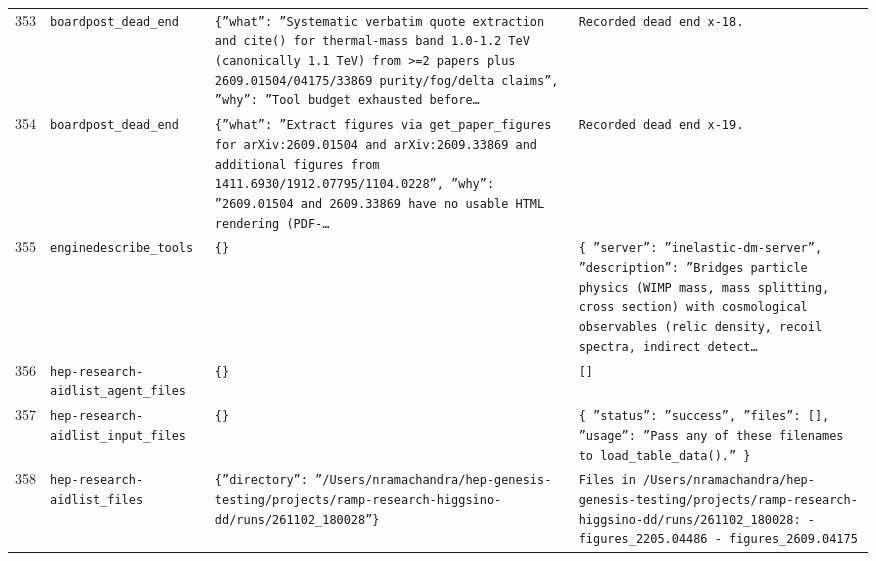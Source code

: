 \documentclass[11pt,a4paper]{article}
\begin{document}
\begin{longtable}{@{}p{}p{}p{}p{}@{}}
353 & \texttt{board}\newline\texttt{post\_\allowbreak{}dead\_\allowbreak{}end} & \texttt{\{''what'':\allowbreak{} ''Systematic verbatim quote extraction and cite()\allowbreak{} for thermal-mass band 1.0-1.2 TeV (canonically 1.1 TeV)\allowbreak{} from \textgreater{}\allowbreak{}=\allowbreak{}2 papers plus 2609.01504/\allowbreak{}04175/\allowbreak{}33869 purity/\allowbreak{}fog/\allowbreak{}delta claims'',\allowbreak{} ''why'':\allowbreak{} ''Tool budget exhausted before\ldots{}\allowbreak{}} & \texttt{Recorded dead end x-18.} \\
354 & \texttt{board}\newline\texttt{post\_\allowbreak{}dead\_\allowbreak{}end} & \texttt{\{''what'':\allowbreak{} ''Extract figures via get\_\allowbreak{}paper\_\allowbreak{}figures for arXiv:\allowbreak{}2609.01504 and arXiv:\allowbreak{}2609.33869 and additional figures from 1411.6930/\allowbreak{}1912.07795/\allowbreak{}1104.0228'',\allowbreak{} ''why'':\allowbreak{} ''2609.01504 and 2609.33869 have no usable HTML rendering (PDF-\ldots{}\allowbreak{}} & \texttt{Recorded dead end x-19.} \\
355 & \texttt{engine}\newline\texttt{describe\_\allowbreak{}tools} & \texttt{\{\}\allowbreak{}} & \texttt{\{   ''server'':\allowbreak{} ''inelastic-dm-server'',\allowbreak{}   ''description'':\allowbreak{} ''Bridges particle physics (WIMP mass,\allowbreak{} mass splitting,\allowbreak{} cross section)\allowbreak{} with cosmological observables (relic density,\allowbreak{} recoil spectra,\allowbreak{} indirect detect\ldots{}\allowbreak{}} \\
356 & \texttt{hep-research-aid}\newline\texttt{list\_\allowbreak{}agent\_\allowbreak{}files} & \texttt{\{\}\allowbreak{}} & \texttt{[]\allowbreak{}} \\
357 & \texttt{hep-research-aid}\newline\texttt{list\_\allowbreak{}input\_\allowbreak{}files} & \texttt{\{\}\allowbreak{}} & \texttt{\{   ''status'':\allowbreak{} ''success'',\allowbreak{}   ''files'':\allowbreak{} []\allowbreak{},\allowbreak{}   ''usage'':\allowbreak{} ''Pass any of these filenames to load\_\allowbreak{}table\_\allowbreak{}data()\allowbreak{}.'' \}\allowbreak{}} \\
358 & \texttt{hep-research-aid}\newline\texttt{list\_\allowbreak{}files} & \texttt{\{''directory'':\allowbreak{} ''/\allowbreak{}Users/\allowbreak{}nramachandra/\allowbreak{}hep-genesis-testing/\allowbreak{}projects/\allowbreak{}ramp-research-higgsino-dd/\allowbreak{}runs/\allowbreak{}261102\_\allowbreak{}180028''\}\allowbreak{}} & \texttt{Files in /\allowbreak{}Users/\allowbreak{}nramachandra/\allowbreak{}hep-genesis-testing/\allowbreak{}projects/\allowbreak{}ramp-research-higgsino-dd/\allowbreak{}runs/\allowbreak{}261102\_\allowbreak{}180028:\allowbreak{}   - figures\_\allowbreak{}2205.04486   - figures\_\allowbreak{}2609.04175} \\

\end{longtable}
\end{document}
